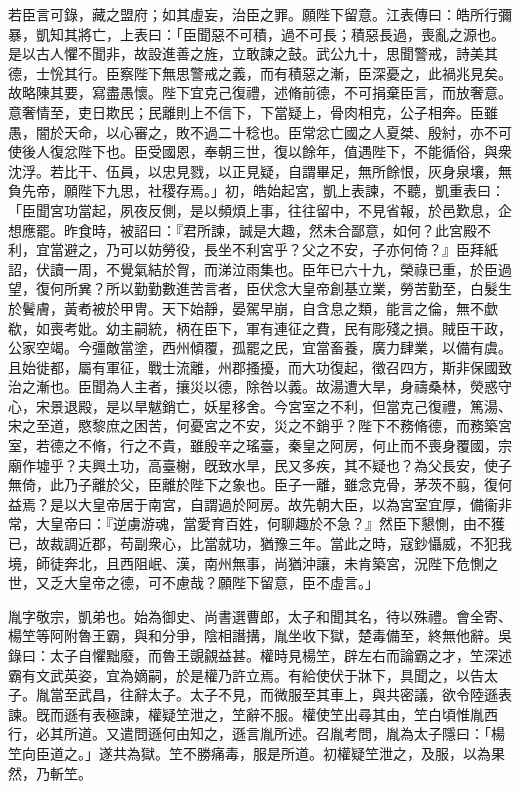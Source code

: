 \begin{pinyinscope}
若臣言可錄，藏之盟府；如其虛妄，治臣之罪。願陛下留意。江表傳曰：皓所行彌暴，凱知其將亡，上表曰：「臣聞惡不可積，過不可長；積惡長過，喪亂之源也。是以古人懼不聞非，故設進善之旌，立敢諫之鼓。武公九十，思聞警戒，詩美其德，士恱其行。臣察陛下無思警戒之義，而有積惡之漸，臣深憂之，此禍兆見矣。故略陳其要，寫盡愚懷。陛下宜克己復禮，述脩前德，不可捐棄臣言，而放奢意。意奢情至，吏日欺民；民離則上不信下，下當疑上，骨肉相克，公子相奔。臣雖愚，闇於天命，以心審之，敗不過二十稔也。臣常忿亡國之人夏桀、殷紂，亦不可使後人復忿陛下也。臣受國恩，奉朝三世，復以餘年，值遇陛下，不能循俗，與衆沈浮。若比干、伍員，以忠見戮，以正見疑，自謂畢足，無所餘恨，灰身泉壤，無負先帝，願陛下九思，社稷存焉。」初，皓始起宮，凱上表諫，不聽，凱重表曰：「臣聞宮功當起，夙夜反側，是以頻煩上事，往往留中，不見省報，於邑歎息，企想應罷。昨食時，被詔曰：『君所諫，誠是大趣，然未合鄙意，如何？此宮殿不利，宜當避之，乃可以妨勞役，長坐不利宮乎？父之不安，子亦何倚？』臣拜紙詔，伏讀一周，不覺氣結於胷，而涕泣雨集也。臣年已六十九，榮祿已重，於臣過望，復何所兾？所以勤勤數進苦言者，臣伏念大皇帝創基立業，勞苦勤至，白髮生於鬢膚，黃耇被於甲冑。天下始靜，晏駕早崩，自含息之類，能言之倫，無不歔欷，如喪考妣。幼主嗣統，柄在臣下，軍有連征之費，民有彫殘之損。賊臣干政，公家空竭。今彊敵當塗，西州傾覆，孤罷之民，宜當畜養，廣力肆業，以備有虞。且始徙都，屬有軍征，戰士流離，州郡搔擾，而大功復起，徵召四方，斯非保國致治之漸也。臣聞為人主者，攘災以德，除咎以義。故湯遭大旱，身禱桑林，熒惑守心，宋景退殿，是以旱魃銷亡，妖星移舍。今宮室之不利，但當克己復禮，篤湯、宋之至道，愍黎庶之困苦，何憂宮之不安，災之不銷乎？陛下不務脩德，而務築宮室，若德之不脩，行之不貴，雖殷辛之瑤臺，秦皇之阿房，何止而不喪身覆國，宗廟作墟乎？夫興土功，高臺榭，旣致水旱，民又多疾，其不疑也？為父長安，使子無倚，此乃子離於父，臣離於陛下之象也。臣子一離，雖念克骨，茅茨不翦，復何益焉？是以大皇帝居于南宮，自謂過於阿房。故先朝大臣，以為宮室宜厚，備衞非常，大皇帝曰：『逆虜游魂，當愛育百姓，何聊趣於不急？』然臣下懇惻，由不獲已，故裁調近郡，苟副衆心，比當就功，猶豫三年。當此之時，寇鈔懾威，不犯我境，師徒奔北，且西阻岷、漢，南州無事，尚猶沖讓，未肯築宮，況陛下危惻之世，又乏大皇帝之德，可不慮哉？願陛下留意，臣不虛言。」

胤字敬宗，凱弟也。始為御史、尚書選曹郎，太子和聞其名，待以殊禮。會全寄、楊笁等阿附魯王霸，與和分爭，陰相譖搆，胤坐收下獄，楚毒備至，終無他辭。吳錄曰：太子自懼黜廢，而魯王覬覦益甚。權時見楊笁，辟左右而論霸之才，笁深述霸有文武英姿，宜為嫡嗣，於是權乃許立焉。有給使伏于牀下，具聞之，以告太子。胤當至武昌，往辭太子。太子不見，而微服至其車上，與共密議，欲令陸遜表諫。旣而遜有表極諫，權疑笁泄之，笁辭不服。權使笁出尋其由，笁白頃惟胤西行，必其所道。又遣問遜何由知之，遜言胤所述。召胤考問，胤為太子隱曰：「楊笁向臣道之。」遂共為獄。笁不勝痛毒，服是所道。初權疑笁泄之，及服，以為果然，乃斬笁。


\end{pinyinscope}

